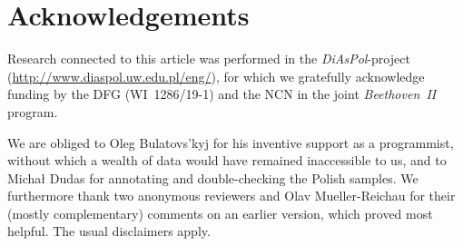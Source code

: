 \documentclass[output=paper]{langscibook}
\begin{document}

\section*{Acknowledgements}\largerpage
Research connected to this article was performed in the \textit{DiAsPol}-project (\url{http://www.diaspol.uw.edu.pl/eng/}), for which we gratefully acknowledge funding by the DFG (WI~1286/19-1) and the NCN in the joint \textit{Beethoven~II} program.

We are obliged to Oleg Bulatovs’kyj for his inventive support as a programmist, without which a wealth of data would have remained inaccessible to us, and to Michał Dudas for annotating and double-checking the Polish samples. We furthermore thank two anonymous reviewers and Olav Mueller-Reichau for their (mostly complementary) comments on an earlier version, which proved most helpful. The usual disclaimers apply.

\printbibliography[heading=subbibliography,notkeyword=this]
\end{document}
